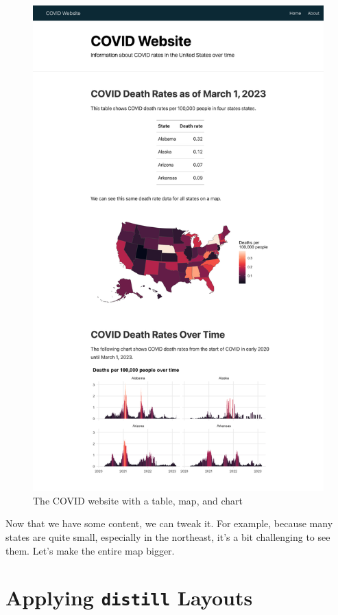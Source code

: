 \documentclass[
]{book}
\begin{document}
\begin{figure}
\includegraphics[width=1\linewidth]{assets/covid-website-static-page} \caption{The COVID website with a table, map, and chart}\label{fig:covid-website-static-page}
\end{figure}

Now that we have some content, we can tweak it. For example, because many states are quite small, especially in the northeast, it's a bit challenging to see them. Let's make the entire map bigger.

\hypertarget{applying-distill-layouts}{%
\section*{\texorpdfstring{Applying \texttt{distill} Layouts}{Applying distill Layouts}}\label{applying-distill-layouts}}
\end{document}
